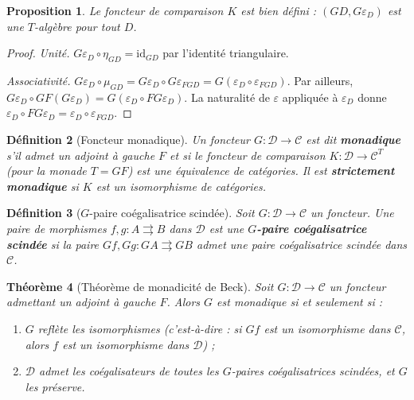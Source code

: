 \documentclass[a4paper,12pt]{book}
\newcommand{\id}{\mathrm{id}}
\newtheorem{theoreme}{Théorème}[chapter]
\newtheorem{proposition}[theoreme]{Proposition}
\newtheorem{definition}[theoreme]{Définition}
\begin{document}
\begin{proposition}\label{prop:comparaison-bien-defini}
Le foncteur de comparaison $K$ est bien défini :
$(GD, G\varepsilon_D)$ est une $T$-algèbre pour tout $D$.
\end{proposition}

\begin{proof}
\emph{Unité.}
$G\varepsilon_D \circ \eta_{GD} = \id_{GD}$ par l'identité triangulaire.

\emph{Associativité.}
$G\varepsilon_D \circ \mu_{GD} = G\varepsilon_D \circ G\varepsilon_{FGD}
= G(\varepsilon_D \circ \varepsilon_{FGD})$.
Par ailleurs, $G\varepsilon_D \circ GF(G\varepsilon_D)
= G(\varepsilon_D \circ FG\varepsilon_D)$.
La naturalité de $\varepsilon$ appliquée à $\varepsilon_D$ donne
$\varepsilon_D \circ FG\varepsilon_D = \varepsilon_D \circ \varepsilon_{FGD}$.
\end{proof}

\begin{definition}[Foncteur monadique]\label{def:foncteur-monadique}
Un foncteur $G \colon \mathcal{D} \to \mathcal{C}$ est dit
\textbf{monadique} s'il admet un adjoint à gauche $F$ et si le
foncteur de comparaison $K \colon \mathcal{D} \to \mathcal{C}^T$
(pour la monade $T = GF$) est une équivalence de catégories.
Il est \textbf{strictement monadique} si $K$ est un isomorphisme
de catégories.
\end{definition}

\begin{definition}[$G$-paire coégalisatrice scindée]\label{def:G-paire-coeg}
Soit $G \colon \mathcal{D} \to \mathcal{C}$ un foncteur.
Une paire de morphismes $f, g \colon A \rightrightarrows B$ dans $\mathcal{D}$
est une \textbf{$G$-paire coégalisatrice scindée} si la paire
$Gf, Gg \colon GA \rightrightarrows GB$ admet une paire coégalisatrice
scindée dans $\mathcal{C}$.
\end{definition}

\begin{theoreme}[Théorème de monadicité de Beck]\label{thm:beck}
Soit $G \colon \mathcal{D} \to \mathcal{C}$ un foncteur admettant
un adjoint à gauche $F$. Alors $G$ est monadique si et seulement si :
\begin{enumerate}[label=(\roman*)]
\item $G$ reflète les isomorphismes
    (c'est-à-dire : si $Gf$ est un isomorphisme dans $\mathcal{C}$,
    alors $f$ est un isomorphisme dans $\mathcal{D}$) ;
\item $\mathcal{D}$ admet les coégalisateurs de toutes les
    $G$-paires coégalisatrices scindées, et $G$ les préserve.
\end{enumerate}
\end{theoreme}
\end{document}
